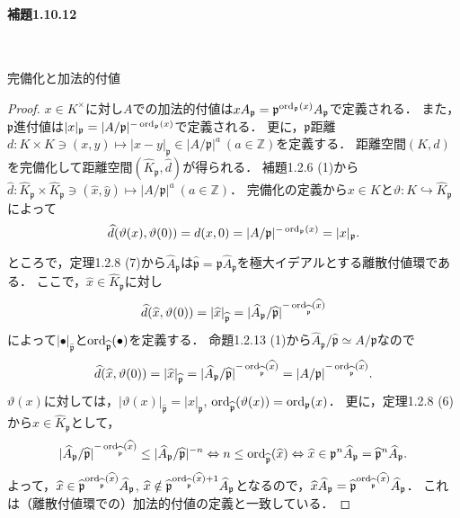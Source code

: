 \paragraph{補題1.10.12}~
\begin{screen}
  完備化と加法的付値
\end{screen}
\begin{proof}
  $x\in K^\times$に対し$A$での加法的付値は$xA_\mathfrak{p}=\mathfrak{p}^{\operatorname{ord}_\mathfrak{p}(x)}A_\mathfrak{p}$で定義される．
  また，$\mathfrak{p}$進付値は$\lvert x\rvert _\mathfrak{p}=\lvert A/\mathfrak{p}\rvert^{-\operatorname{ord}_\mathfrak{p}(x)}$で定義される．
  更に，$\mathfrak{p}$距離$d\colon K\times K\ni(x,y)\mapsto\lvert x-y\rvert _\mathfrak{p}\in\lvert A/\mathfrak{p}\rvert^a\ (a\in\mathbb{Z})$を定義する．
  距離空間$(K,d)$を完備化して距離空間$(\widehat{K}_\mathfrak{p},\widehat{d})$が得られる．
  補題1.2.6 (1)から$\widehat{d}\colon\widehat{K}_\mathfrak{p}\times\widehat{K}_\mathfrak{p}\ni(\widehat{x},\widehat{y})\mapsto\lvert A/\mathfrak{p}\rvert^a\ (a\in\mathbb{Z})$．
  完備化の定義から$x\in K$と$\vartheta\colon K\hookrightarrow\widehat{K}_\mathfrak{p}$によって
  \[\widehat{d}(\vartheta(x),\vartheta(0))=d(x,0)=\lvert A/\mathfrak{p}\rvert^{-\operatorname{ord}_\mathfrak{p}(x)}=\lvert x\rvert _\mathfrak{p}.\]

  ところで，定理1.2.8 (7)から$\widehat{A}_\mathfrak{p}$は$\widehat{\mathfrak{p}}=\mathfrak{p}\widehat{A}_\mathfrak{p}$を極大イデアルとする離散付値環である．
  ここで，$\widehat{x}\in\widehat{K}_\mathfrak{p}$に対し
  \[\widehat{d}(\widehat{x},\vartheta(0))=\lvert\widehat{x}\rvert _{\widehat{\mathfrak{p}}}=\lvert\widehat{A}_\mathfrak{p}/\widehat{\mathfrak{p}}\rvert^{-\operatorname{ord}_{\widehat{\mathfrak{p}}}(\widehat{x})}\]
  によって$\lvert\bullet\rvert _{\widehat{\mathfrak{p}}}$と$\operatorname{ord}_{\widehat{\mathfrak{p}}}(\bullet)$を定義する．
  命題1.2.13 (1)から$\widehat{A}_\mathfrak{p}/\widehat{\mathfrak{p}}\simeq A/\mathfrak{p}$なので
  \[\widehat{d}(\widehat{x},\vartheta(0))=\lvert\widehat{x}\rvert _{\widehat{\mathfrak{p}}}=\lvert\widehat{A}_\mathfrak{p}/\widehat{\mathfrak{p}}\rvert^{-\operatorname{ord}_{\widehat{\mathfrak{p}}}(\widehat{x})}=\lvert A/\mathfrak{p}\rvert^{-\operatorname{ord}_{\widehat{\mathfrak{p}}}(\widehat{x})}.\]
  $\vartheta(x)$に対しては，$\lvert\vartheta(x)\rvert _{\widehat{\mathfrak{p}}}=\lvert x\rvert _\mathfrak{p}$, $\operatorname{ord}_{\widehat{\mathfrak{p}}}(\vartheta(x))=\operatorname{ord}_\mathfrak{p}(x)$．
  更に，定理1.2.8 (6)から$\widehat{x}\in\widehat{K}_\mathfrak{p}$として，
  \[\lvert\widehat{A}_\mathfrak{p}/\widehat{\mathfrak{p}}\rvert^{-\operatorname{ord}_{\widehat{\mathfrak{p}}}(\widehat{x})}\leq\lvert\widehat{A}_\mathfrak{p}/\widehat{\mathfrak{p}}\rvert^{-n}\Leftrightarrow n\leq\operatorname{ord}_{\widehat{\mathfrak{p}}}(\widehat{x})\Leftrightarrow\widehat{x}\in\mathfrak{p}^n\widehat{A}_\mathfrak{p}=\widehat{\mathfrak{p}}^n\widehat{A}_\mathfrak{p}.\]
  よって，$\widehat{x}\in\widehat{\mathfrak{p}}^{\operatorname{ord}_{\widehat{\mathfrak{p}}}(\widehat{x})}\widehat{A}_\mathfrak{p}$, $\widehat{x}\notin\widehat{\mathfrak{p}}^{\operatorname{ord}_{\widehat{\mathfrak{p}}}(\widehat{x})+1}\widehat{A}_\mathfrak{p}$となるので，$\widehat{x}\widehat{A}_\mathfrak{p}=\widehat{\mathfrak{p}}^{\operatorname{ord}_{\widehat{\mathfrak{p}}}(\widehat{x})}\widehat{A}_\mathfrak{p}$．
  これは（離散付値環での）加法的付値の定義と一致している．


\end{proof}
